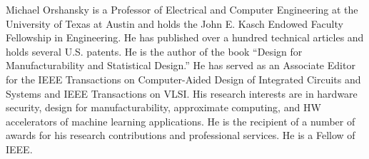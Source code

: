 \documentclass[9.5pt,journal,compsoc]{IEEEtran}
\begin{document}
\begin{IEEEbiography}%
{Michael Orshansky} is a Professor of Electrical and Computer Engineering at the University of Texas at Austin and holds the John E. Kasch Endowed Faculty Fellowship in Engineering. He has published over a hundred technical articles and holds several U.S. patents. He is the author of the book “Design for Manufacturability and Statistical Design.” He has served as an Associate Editor for the IEEE Transactions on Computer-Aided Design of Integrated Circuits and Systems and IEEE Transactions on VLSI. His research interests are in hardware security, design for manufacturability, approximate computing, and HW accelerators of machine learning applications. He is the recipient of a number of awards for his research contributions and professional services. He is a Fellow of IEEE.
\end{IEEEbiography}
\end{document}
